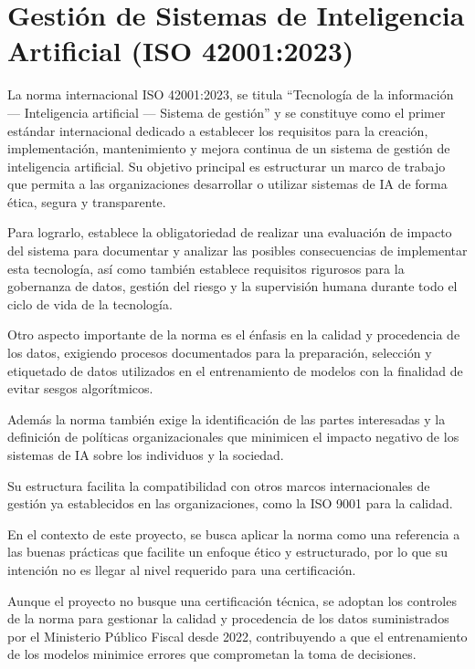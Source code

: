 \section{Gestión de Sistemas de Inteligencia Artificial (ISO 42001:2023)}\label{gestion-de-sistemas-de-inteligencia-artificial-iso-420012023}

La norma internacional ISO 42001:2023, se titula \enquote{Tecnología de la información --- Inteligencia artificial --- Sistema de gestión} y se constituye como el primer estándar internacional dedicado a establecer los requisitos para la creación, implementación, mantenimiento y mejora continua de un sistema de gestión de inteligencia artificial. Su objetivo principal es estructurar un marco de trabajo que permita a las organizaciones desarrollar o utilizar sistemas de IA de forma ética, segura y transparente.

Para lograrlo, establece la obligatoriedad de realizar una evaluación de impacto del sistema para documentar y analizar las posibles consecuencias de implementar esta tecnología, así como también establece requisitos rigurosos para la gobernanza de datos, gestión del riesgo y la supervisión humana durante todo el ciclo de vida de la tecnología.

Otro aspecto importante de la norma es el énfasis en la calidad y procedencia de los datos, exigiendo procesos documentados para la preparación, selección y etiquetado de datos utilizados en el entrenamiento de modelos con la finalidad de evitar sesgos algorítmicos.

Además la norma también exige la identificación de las partes interesadas y la definición de políticas organizacionales que minimicen el impacto negativo de los sistemas de IA sobre los individuos y la sociedad.

Su estructura facilita la compatibilidad con otros marcos internacionales de gestión ya establecidos en las organizaciones, como la ISO 9001 para la calidad.

En el contexto de este proyecto, se busca aplicar la norma como una referencia a las buenas prácticas que facilite un enfoque ético y estructurado, por lo que su intención no es llegar al nivel requerido para una certificación.

Aunque el proyecto no busque una certificación técnica, se adoptan los controles de la norma para gestionar la calidad y procedencia de los datos suministrados por el Ministerio Público Fiscal desde 2022, contribuyendo a que el entrenamiento de los modelos minimice errores que comprometan la toma de decisiones.

